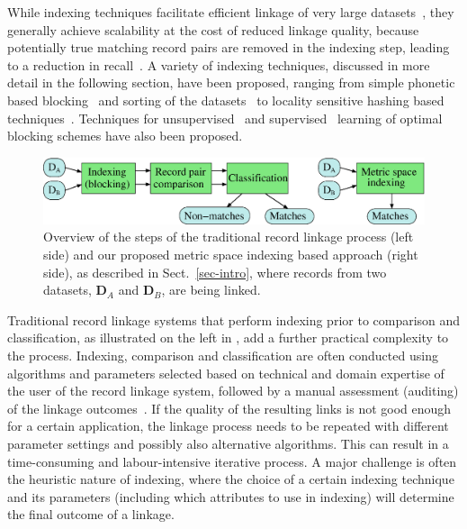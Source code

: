\documentclass{llncs}
\begin{document}
While indexing techniques facilitate efficient linkage of very large
datasets~\cite{Don15}, they generally achieve scalability at the cost
of reduced linkage quality, because potentially true matching record
pairs are removed in the indexing step, leading to a reduction in
recall~\cite{Chr12}. A variety of indexing
techniques, discussed in more detail in the following section, have
been proposed, ranging from simple phonetic based blocking~\cite{Chr12}
and sorting of the datasets~\cite{Dra12} to locality sensitive hashing
based techniques~\cite{Kim10,Steorts2014}. Techniques for
unsupervised~\cite{Kej13,Ram15} and supervised~\cite{Bil06,Mic06}
learning of optimal blocking schemes have also been proposed.


\begin{figure}[!t]
  \centering
  \includegraphics[width=1.0\textwidth]{figures/linkage-process}
  \caption{Overview of the steps of the traditional record linkage
           process (left side) and our proposed metric space
           indexing based approach (right side), as described in
           Sect.~\ref{sec-intro}, where records from two datasets,
           $\mathbf{D}_A$ and $\mathbf{D}_B$, are being linked.}
           \label{fig-rl-process}
\end{figure}


Traditional record linkage systems that perform indexing prior to
comparison and classification, as illustrated on the left in
, add a further practical complexity to the
process. Indexing, comparison and classification are often conducted
using algorithms and parameters selected based on technical and
domain expertise of the user of the record linkage system, followed
by a manual assessment (auditing) of the linkage
outcomes~\cite{Chr12}. If the quality of the resulting links is not
good enough for a certain application, the linkage process needs to
be repeated with different parameter settings and possibly also
alternative algorithms. This can result in a time-consuming and
labour-intensive iterative process. A major challenge is often the
heuristic nature of indexing, where the choice of a certain indexing
technique and its parameters (including which attributes to use in indexing) will determine the final outcome of a linkage.
\end{document}
